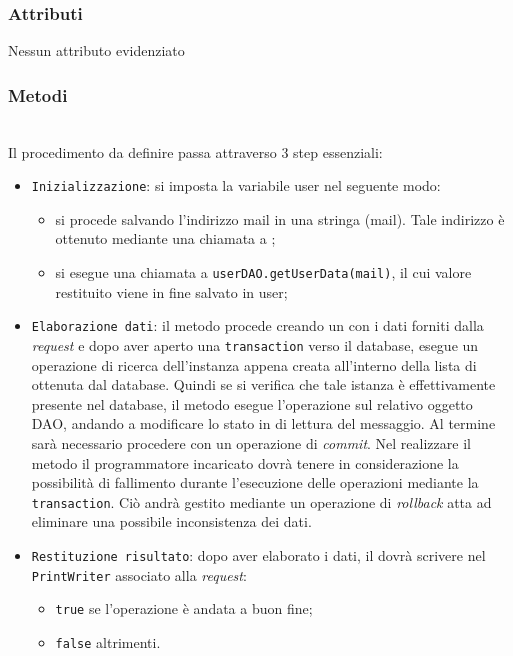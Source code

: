 \subsubsection*{Attributi}

Nessun attributo evidenziato


\subsubsection*{Metodi}
\begin{description}
	\item{}\\
	Il procedimento da definire passa attraverso 3 step essenziali:
	\begin{itemize}
		\item \texttt{Inizializzazione}: si imposta la variabile user nel seguente modo:
			\begin{itemize}
				\item si procede salvando l'indirizzo mail in una stringa (mail). Tale indirizzo è ottenuto mediante una chiamata a ;
				\item si esegue una chiamata a \texttt{userDAO.getUserData(mail)}, il cui valore restituito viene in fine salvato in user;
			\end{itemize}
		\item \texttt{Elaborazione dati}: il metodo procede creando un  con i dati forniti dalla \textit{request} e dopo aver aperto una \texttt{transaction} verso il database, esegue un operazione di ricerca dell'instanza appena creata all'interno della lista di  ottenuta dal database. Quindi se si verifica che tale istanza è effettivamente presente nel database, il metodo esegue l'operazione  sul relativo oggetto DAO, andando a modificare lo stato in di lettura del messaggio. Al termine sarà necessario procedere con un operazione di \textit{commit}. Nel realizzare il metodo il programmatore incaricato dovrà tenere in considerazione la possibilità di fallimento durante l'esecuzione delle operazioni mediante la \texttt{transaction}. Ciò andrà gestito mediante un operazione di \textit{rollback} atta ad eliminare una possibile inconsistenza dei dati.
		\item \texttt{Restituzione risultato}: dopo aver elaborato i dati, il  dovrà scrivere nel \texttt{PrintWriter} associato alla \textit{request}:
			\begin{itemize}
				\item \texttt{true} se l'operazione è andata a buon fine;
				\item \texttt{false} altrimenti.
			\end{itemize}
	\end{itemize}

\end{description}

